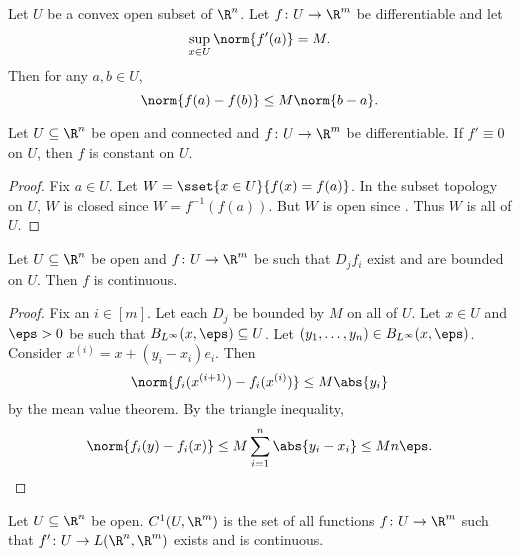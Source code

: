 \begin{proposition}
    Let $U$ be a convex open subset of $\R^n$.
    Let $f\colon U \to \R^m$ be differentiable and let \[
        \sup_{x \in U} \norm{f'(a)} = M.
    \] Then for any $a, b \in U$, \[
        \norm{f(a) - f(b)} \le M \norm{b - a}.
    \]
\end{proposition}

\begin{proposition}
    Let $U \subseteq \R^n$ be open and connected and $f\colon U \to \R^m$
    be differentiable.
    If $f' \equiv 0$ on $U$, then $f$ is constant on $U$.
\end{proposition}
\begin{proof}
    Fix $a \in U$.
    Let $W = \sset{x \in U}{f(x) = f(a)}$.
    In the subset topology on $U$, $W$ is closed since $W = f^{-1}(f(a))$.
    But $W$ is open since \TODO. %
    Thus $W$ is all of $U$.
\end{proof}

\begin{proposition} \label{thm:pdv-cont}
    Let $U \subseteq \R^n$ be open and $f\colon U \to \R^m$ be such that
    $D_j f_i$ exist and are bounded on $U$.
    Then $f$ is continuous.
\end{proposition}
\begin{proof}
    Fix an $i \in [m]$.
    Let each $D_j$ be bounded by $M$ on all of $U$.
    Let $x \in U$ and $\eps > 0$ be such that
    $B_{L^\infty}(x, \eps) \subseteq U$.
    Let $(y_1, \dots, y_n) \in B_{L^\infty}(x, \eps)$.
    Consider $x^{(i)} = x + (y_i - x_i) e_i$.
    Then \[
        \norm{f_i(x^{(i+1)}) - f_i(x^{(i)})} \le M \abs{y_i}
    \] by the mean value theorem.
    By the triangle inequality, \[
        \norm{f_i(y) - f_i(x)} \le M \sum_{i=1}^n \abs{y_i - x_i}
            \le M n \eps. \qedhere
    \]
\end{proof}

\begin{definition} \label{def:c1}
    Let $U \subseteq \R^n$ be open.
    $C^1(U, \R^m)$ is the set of all functions $f\colon U \to \R^m$
    such that $f'\colon U \to L(\R^n, \R^m)$ exists and is continuous.
\end{definition}
